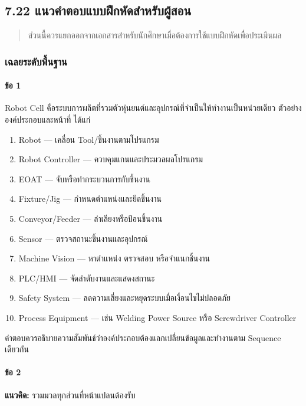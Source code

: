 \subsection{7.22 แนวคำตอบแบบฝึกหัดสำหรับผู้สอน}

\begin{quote}
ส่วนนี้ควรแยกออกจากเอกสารสำหรับนักศึกษาเมื่อต้องการใช้แบบฝึกหัดเพื่อประเมินผล
\end{quote}

\subsubsection{เฉลยระดับพื้นฐาน}

\paragraph{ข้อ 1}

Robot Cell คือระบบการผลิตที่รวมตัวหุ่นยนต์และอุปกรณ์ที่จำเป็นให้ทำงานเป็นหน่วยเดียว ตัวอย่างองค์ประกอบและหน้าที่ ได้แก่

\begin{enumerate}
    \item Robot — เคลื่อน Tool/ชิ้นงานตามโปรแกรม
    \item Robot Controller — ควบคุมแกนและประมวลผลโปรแกรม
    \item EOAT — จับหรือทำกระบวนการกับชิ้นงาน
    \item Fixture/Jig — กำหนดตำแหน่งและยึดชิ้นงาน
    \item Conveyor/Feeder — ลำเลียงหรือป้อนชิ้นงาน
    \item Sensor — ตรวจสถานะชิ้นงานและอุปกรณ์
    \item Machine Vision — หาตำแหน่ง ตรวจสอบ หรือจำแนกชิ้นงาน
    \item PLC/HMI — จัดลำดับงานและแสดงสถานะ
    \item Safety System — ลดความเสี่ยงและหยุดระบบเมื่อเงื่อนไขไม่ปลอดภัย
    \item Process Equipment — เช่น Welding Power Source หรือ Screwdriver Controller
\end{enumerate}

คำตอบควรอธิบายความสัมพันธ์ว่าองค์ประกอบต้องแลกเปลี่ยนข้อมูลและทำงานตาม Sequence เดียวกัน

\paragraph{ข้อ 2}

\textbf{แนวคิด:} รวมมวลทุกส่วนที่หน้าแปลนต้องรับ

